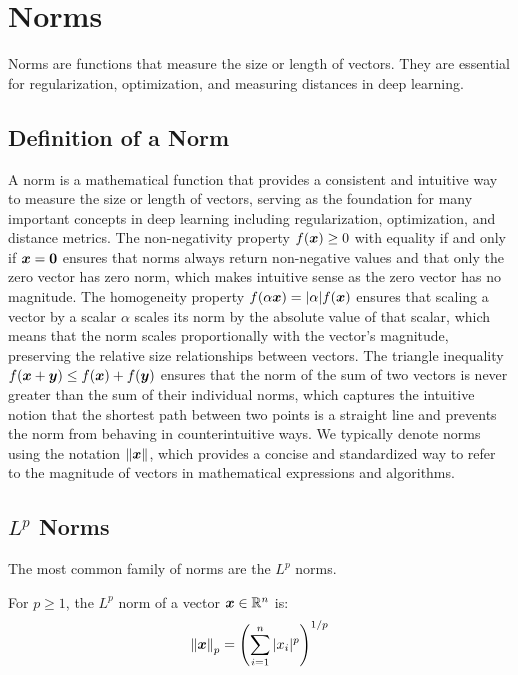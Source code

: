 
\section{Norms }
\label{sec:norms}

Norms are functions that measure the size or length of vectors. They are essential for regularization, optimization, and measuring distances in deep learning.

\subsection{Definition of a Norm}

A norm is a mathematical function that provides a consistent and intuitive way to measure the size or length of vectors, serving as the foundation for many important concepts in deep learning including regularization, optimization, and distance metrics. The non-negativity property $f(\boldsymbol{x}) \geq 0$ with equality if and only if $\boldsymbol{x} = \boldsymbol{0}$ ensures that norms always return non-negative values and that only the zero vector has zero norm, which makes intuitive sense as the zero vector has no magnitude. The homogeneity property $f(\alpha\boldsymbol{x}) = |\alpha|f(\boldsymbol{x})$ ensures that scaling a vector by a scalar $\alpha$ scales its norm by the absolute value of that scalar, which means that the norm scales proportionally with the vector's magnitude, preserving the relative size relationships between vectors. The triangle inequality $f(\boldsymbol{x} + \boldsymbol{y}) \leq f(\boldsymbol{x}) + f(\boldsymbol{y})$ ensures that the norm of the sum of two vectors is never greater than the sum of their individual norms, which captures the intuitive notion that the shortest path between two points is a straight line and prevents the norm from behaving in counterintuitive ways. We typically denote norms using the notation $\left\lVert\boldsymbol{x}\right\rVert$, which provides a concise and standardized way to refer to the magnitude of vectors in mathematical expressions and algorithms.

\subsection{$L^p$ Norms}

The most common family of norms are the $L^p$ norms.

\begin{definition}[$L^p$ Norm]
For $p \geq 1$, the $L^p$ norm of a vector $\boldsymbol{x} \in \mathbb{R}^n$ is:
\begin{equation}
    \left\lVert\boldsymbol{x}\right\rVert_p = \left(\sum_{i=1}^{n} |x_i|^p\right)^{1/p}
\end{equation}
\end{definition}

